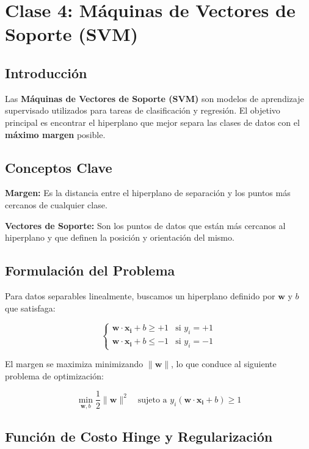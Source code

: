 \documentclass[a4paper, 11pt]{article}
\begin{document}
\newpage
\section{Clase 4: Máquinas de Vectores de Soporte (SVM)}

\subsection{Introducción}
Las \textbf{Máquinas de Vectores de Soporte (SVM)} son modelos de aprendizaje supervisado utilizados para tareas de clasificación y regresión. El objetivo principal es encontrar el hiperplano que mejor separa las clases de datos con el \textbf{máximo margen} posible.

\subsection{Conceptos Clave}

\begin{definition}
\textbf{Margen:} Es la distancia entre el hiperplano de separación y los puntos más cercanos de cualquier clase.
\end{definition}

\begin{definition}
\textbf{Vectores de Soporte:} Son los puntos de datos que están más cercanos al hiperplano y que definen la posición y orientación del mismo.
\end{definition}

\subsection{Formulación del Problema}

Para datos separables linealmente, buscamos un hiperplano definido por $\mathbf{w}$ y $b$ que satisfaga:

\[
\begin{cases}
\mathbf{w} \cdot \mathbf{x_i} + b \geq +1 & \text{si } y_i = +1 \\
\mathbf{w} \cdot \mathbf{x_i} + b \leq -1 & \text{si } y_i = -1
\end{cases}
\]

El margen se maximiza minimizando $\|\mathbf{w}\|$, lo que conduce al siguiente problema de optimización:

\[
\min_{\mathbf{w}, b} \frac{1}{2} \|\mathbf{w}\|^2 \quad \text{sujeto a } y_i (\mathbf{w} \cdot \mathbf{x_i} + b) \geq 1
\]

\subsection{Función de Costo Hinge y Regularización}
\end{document}

